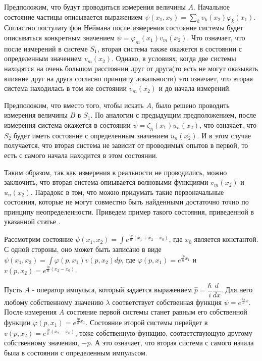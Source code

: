 \documentclass[11pt]{article}
\begin{document}
Предположим, что будут проводиться измерения величины $A$. Начальное состояние частицы описывается выражением  $\psi(x_1, x_2) = \sum_k v_k(x_2)\varphi_k(x_1)$. Согластно постулату фон Неймана после измерения состояние системы будет описываться конкретным значением $\psi = \varphi_m(x_1)v_m(x_2)$. Что означает, что после измерений в системе $S_1$, вторая система также окажется в состоянии с определенным значением $v_m(x_2)$. Однако, в условиях, когда две системы  находятся на очень большом расстоянии друг от друга(то есть не могут оказывать влияние друг на друга согласно принципу локальности) это означает, что вторая система находилась в том же состоянии $v_m(x_2)$ и до начала измерений.

Предположим, что вместо того, чтобы искать $A$, было решено проводить измерения величины  $B$ в $S_1$. По аналогии с предыдущим предположением, после измерения система окажется в состоянии $\psi = \zeta_n(x_1)u_n(x_2)$, что означает, что $S_2$ будет иметь состояние с определенным значением $u_n(x_2)$. И в этом случае получается, что вторая система не зависит от проводимых опытов в первой, то есть с самого начала находится в этом состоянии. 

Таким образом, так как измерения в реальности не проводились, можно заключить, что вторая система опиывается волновыми функциями $v_m(x_2)$ и $u_n(x_2)$. Парадокс в том, что можно придумать такие первоначальные состояния, которые не могут совместно быть найденными достаточно точно по принципу неопределенности. Приведем пример такого состояния, приведенной в  указанной статье \cite{EPR}.

Рассмотрим состояние $\psi(x_1, x_2) = \int e^{\frac{ip}{\hbar}(x_1+x_2-x_0)}$, где $x_0$ является константой. С одной стороны, оно может быть записано в виде $\psi(x_1, x_2) = \int\varphi(p, x_1)v(p, x_2)dp$, где $\varphi(p, x_1) = e^{\frac{ip}{\hbar}x_1}$ и $v(p, x_2) = e^{\frac{ip}{\hbar}(x_2-x_0)}$. 

Пусть $A$ - оператор импульса, который задается выражением $\hat{p} = \dfrac{\hbar}{i}\dfrac{d}{dx}$. Для него любому собственному значению $\lambda$ соответствует собственная функция $\psi = e^{\frac{i\lambda}{\hbar}x}$. После измерения $A$ состояние первой системы станет равным его собственной функции $\varphi(p, x_1) = e^{\frac{ip}{\hbar}x_1}$. Состояние второй системы перейдет в $v(p, x_2) = e^{\frac{ip}{\hbar}(x_2-x_0)}$, тоже собственную функцию, соответствующую другому собственному значению, $-p$. А это означает, что вторая система с самого начала была в состоянии с определенным импульсом.
\end{document}
